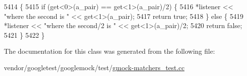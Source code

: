 \begin{DoxyCode}
5414                                                             \{
5415     \textcolor{keywordflow}{if} (get<0>(a\_pair) == get<1>(a\_pair)/2) \{
5416       *listener << \textcolor{stringliteral}{"where the second is "} << get<1>(a\_pair);
5417       \textcolor{keywordflow}{return} \textcolor{keyword}{true};
5418     \} \textcolor{keywordflow}{else} \{
5419       *listener << \textcolor{stringliteral}{"where the second/2 is "} << get<1>(a\_pair)/2;
5420       \textcolor{keywordflow}{return} \textcolor{keyword}{false};
5421     \}
5422   \}
\end{DoxyCode}


The documentation for this class was generated from the following file\+:\begin{DoxyCompactItemize}
\item 
vendor/googletest/googlemock/test/\hyperlink{gmock-matchers__test_8cc}{gmock-\/matchers\+\_\+test.\+cc}\end{DoxyCompactItemize}
